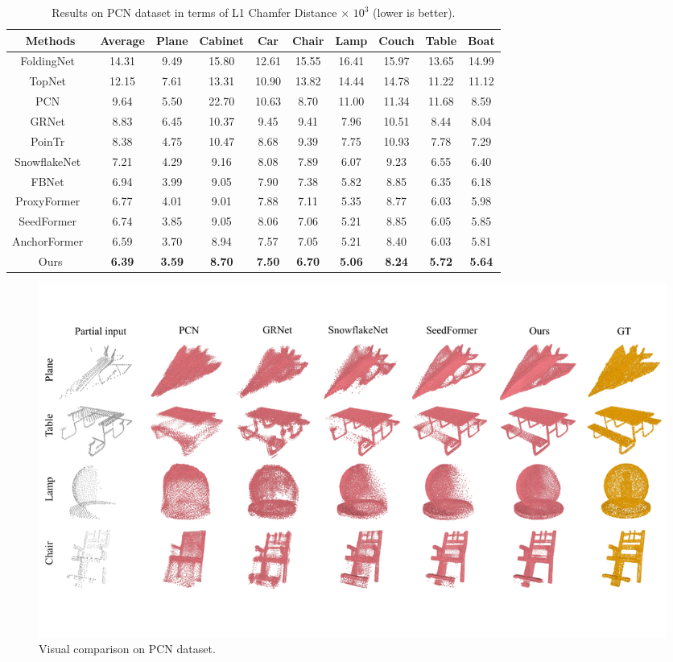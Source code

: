 \documentclass[letterpaper]{article} %
\begin{document}
\begin{table} [t]
\begin{center}
\begin{tabular}{c |  c | cccc cccc}
\toprule
Methods & Average & Plane &Cabinet& Car& Chair& Lamp &Couch &Table  &Boat\\
\midrule
FoldingNet~\cite{yang2018foldingnet}	&14.31	&9.49	&15.80	&12.61	&15.55	&16.41	&15.97	&13.65	&14.99\\
TopNet~\cite{tchapmi2019topnet}		&12.15	&7.61	&13.31	&10.90	&13.82	&14.44	&14.78	&11.22	&11.12\\
PCN~\cite{yuan2018pcn}		&9.64	&5.50	&22.70	&10.63	&8.70	&11.00	&11.34	&11.68	&8.59\\
GRNet~\cite{xie2020grnet}	&8.83	&6.45	&10.37	&9.45	&9.41	&7.96	&10.51	&8.44	&8.04\\
PoinTr~\cite{yu2021pointr}		&8.38	&4.75	&10.47	&8.68	&9.39	&7.75	&10.93	&7.78	&7.29\\
SnowflakeNet~\cite{xiang2021snowflakenet}&7.21	&4.29	&9.16	&8.08	&7.89	&6.07	&9.23	&6.55	&6.40\\
FBNet~\cite{yan2022fbnet}&6.94	&3.99	&9.05	&7.90	&7.38	&5.82	&8.85	&6.35	&6.18\\
ProxyFormer~\cite{li2023proxyformer} & 6.77 & 4.01& 9.01& 7.88& 7.11& 5.35& 8.77& 6.03& 5.98\\
SeedFormer~\cite{zhou2022seedformer} &6.74	&3.85	&9.05	&8.06	&7.06	&5.21	&8.85	&6.05	&5.85\\
AnchorFormer~\cite{chen2023anchorformer} & 6.59 & 3.70 &8.94& 7.57 &7.05 &5.21& 8.40 &6.03 &5.81\\
\midrule
Ours &\bf6.39	&\bf3.59	&\bf8.70	&\bf7.50	&\bf6.70	&\bf5.06	&\bf8.24	&\bf5.72	&\bf5.64\\
\bottomrule
\end{tabular}
\end{center}
\caption{Results on PCN dataset in terms of L1 Chamfer Distance $\times$ $10^3$ (lower is better). } \label{tab:pcn1}
\end{table}

\begin{figure}[!t]
\begin{center}
\includegraphics[width=1.0\linewidth]{Figures/vis_1.pdf}
\end{center}
   \caption{Visual comparison on PCN dataset.}
\label{fig:pcn}
\end{figure}
\end{document}
